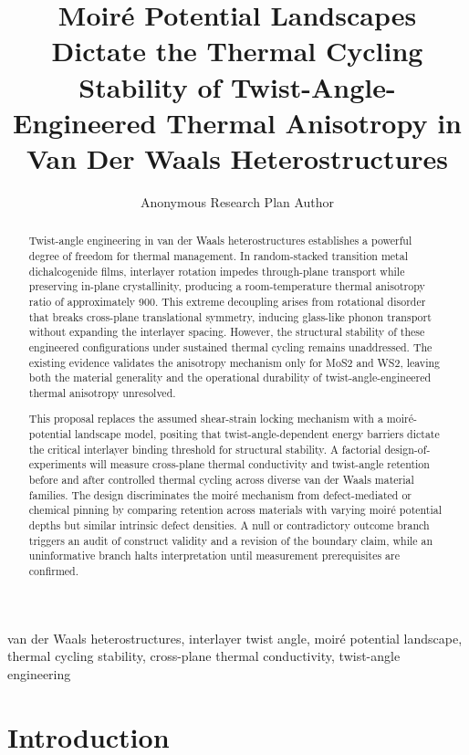 \documentclass[conference]{IEEEtran}
\begin{document}
\title{Moiré Potential Landscapes Dictate the Thermal Cycling Stability of Twist-Angle-Engineered Thermal Anisotropy in Van Der Waals Heterostructures}\author{Anonymous Research Plan Author}\maketitle

\begin{abstract}
Twist-angle engineering in van der Waals heterostructures establishes a powerful degree of freedom for thermal management. In random-stacked transition metal dichalcogenide films, interlayer rotation impedes through-plane transport while preserving in-plane crystallinity, producing a room-temperature thermal anisotropy ratio of approximately 900. This extreme decoupling arises from rotational disorder that breaks cross-plane translational symmetry, inducing glass-like phonon transport without expanding the interlayer spacing. However, the structural stability of these engineered configurations under sustained thermal cycling remains unaddressed. The existing evidence validates the anisotropy mechanism only for MoS2 and WS2, leaving both the material generality and the operational durability of twist-angle-engineered thermal anisotropy unresolved.

This proposal replaces the assumed shear-strain locking mechanism with a moiré-potential landscape model, positing that twist-angle-dependent energy barriers dictate the critical interlayer binding threshold for structural stability. A factorial design-of-experiments will measure cross-plane thermal conductivity and twist-angle retention before and after controlled thermal cycling across diverse van der Waals material families. The design discriminates the moiré mechanism from defect-mediated or chemical pinning by comparing retention across materials with varying moiré potential depths but similar intrinsic defect densities. A null or contradictory outcome branch triggers an audit of construct validity and a revision of the boundary claim, while an uninformative branch halts interpretation until measurement prerequisites are confirmed.
\end{abstract}
\begin{IEEEkeywords}
van der Waals heterostructures, interlayer twist angle, moiré potential landscape, thermal cycling stability, cross-plane thermal conductivity, twist-angle engineering
\end{IEEEkeywords}\section{Introduction}
\end{document}
